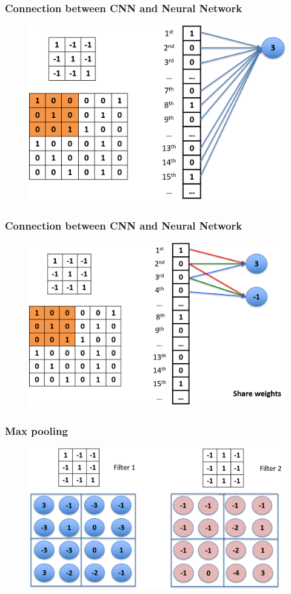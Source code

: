 \documentclass{beamer}
\begin{document}
\begin{frame}
	\frametitle{Connection between CNN and Neural Network}
	\begin{figure}
		\includegraphics[width=0.8\linewidth]{Picture5}
	\end{figure}
\end{frame}

\begin{frame}
	\frametitle{Connection between CNN and Neural Network}
	\begin{figure}
	\includegraphics[width=0.8\linewidth]{Picture6}
	\end{figure}
\end{frame}

\begin{frame}
	\frametitle{Max pooling}
	\begin{figure}
		\includegraphics[width=0.8\linewidth]{Picture7}
	\end{figure}
\end{frame}
\end{document}
